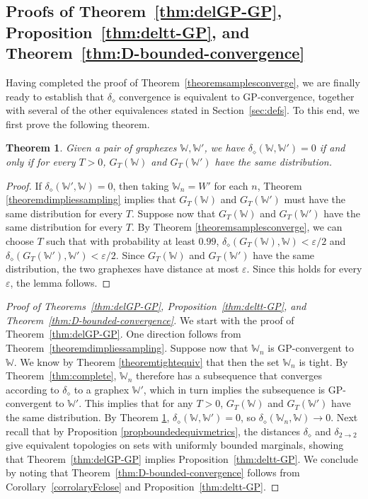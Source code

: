 \documentclass{amsart}
\numberwithin{equation}{section}
\numberwithin{figure}{section}
\newtheorem{theorem}{Theorem}[section]
\theoremstyle{definition}
\theoremstyle{remark}
\newcommand{\cW}{\mathbb{W}}
\newcommand{\deltt}{\delta_{2\to 2}}
\def\delGP{\delta_\diamond}
\begin{document}
\subsection{Proofs of Theorem~\ref{thm:delGP-GP}, Proposition~\ref{thm:deltt-GP}, and Theorem~\ref{thm:D-bounded-convergence}}

Having completed the proof of Theorem~\ref{theoremsamplesconverge}, we are
finally ready to establish that $\delGP$ convergence is equivalent to
GP-convergence, together with several of the other equivalences stated in
Section~\ref{sec:defs}. To this end, we first prove the following theorem.

\begin{theorem} \label{theoremsamedistribution}
Given a pair of graphexes $\cW,\cW'$, we have $\delGP(\cW,\cW')=0$ if and
only if for every $T>0$, $G_T(\cW)$ and $G_T(\cW')$ have the same
distribution.
\end{theorem}

\begin{proof}
If $\delGP(\cW',\cW)=0$, then taking $\cW_n=W'$ for each $n$, Theorem
\ref{theoremdimpliessampling} implies that $G_T(\cW)$ and $G_T(\cW')$ must
have the same distribution for every $T$. Suppose now that $G_T(\cW)$ and
$G_T(\cW')$ have the same distribution for every $T$. By Theorem
\ref{theoremsamplesconverge}, we can choose $T$ such that with probability at
least $0.99$, $\delGP(G_T(\cW),\cW)<\varepsilon/2$ and
$\delGP(G_T(\cW'),\cW')<\varepsilon/2$. Since $G_T(\cW)$ and $G_T(\cW')$ have
the same distribution, the two graphexes have distance at most $\varepsilon$.
Since this holds for every $\varepsilon$, the lemma follows.
\end{proof}

\begin{proof}[Proof of Theorems~\ref{thm:delGP-GP}, Proposition~\ref{thm:deltt-GP}, and Theorem~\ref{thm:D-bounded-convergence}]
We start with the proof of Theorem~\ref{thm:delGP-GP}. One direction follows
from Theorem~\ref{theoremdimpliessampling}. Suppose now that $\cW_n $ is
GP-convergent to $\cW$. We know by Theorem \ref{theoremtightequiv} that then
the set $\cW_n$ is tight. By Theorem~\ref{thm:complete}, $\cW_n$ therefore
has a subsequence that converges according to $\delGP$ to a graphex $\cW'$,
which in turn implies the subsequence is GP-convergent to $\cW'$. This
implies that for any $T>0$, $G_T(\cW)$ and $G_T(\cW')$ have the same
distribution. By Theorem \ref{theoremsamedistribution}, $\delGP(\cW,\cW')=0$,
so $\delGP(\cW_n,\cW) \rightarrow 0$. Next recall that by Proposition
\ref{propboundedequivmetrics}, the distances $\delGP$ and $\deltt$ give
equivalent topologies on sets with uniformly bounded marginals, showing that
Theorem~\ref{thm:delGP-GP} implies Proposition~\ref{thm:deltt-GP}. We
conclude by noting that Theorem~\ref{thm:D-bounded-convergence} follows from
Corollary~\ref{corrolaryFclose} and Proposition~\ref{thm:deltt-GP}.
\end{proof}
\end{document}
